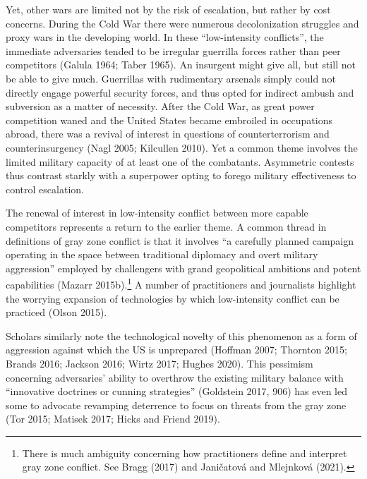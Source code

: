 \documentclass[
]{article}
\begin{document}
Yet, other wars are limited not by the risk of escalation, but rather by cost concerns. During the Cold War there were numerous decolonization struggles and proxy wars in the developing world. In these ``low-intensity conflicts'', the immediate adversaries tended to be irregular guerrilla forces rather than peer competitors (Galula 1964; Taber 1965). An insurgent might give all, but still not be able to give much. Guerrillas with rudimentary arsenals simply could not directly engage powerful security forces, and thus opted for indirect ambush and subversion as a matter of necessity. After the Cold War, as great power competition waned and the United States became embroiled in occupations abroad, there was a revival of interest in questions of counterterrorism and counterinsurgency (Nagl 2005; Kilcullen 2010). Yet a common theme involves the limited military capacity of at least one of the combatants. Asymmetric contests thus contrast starkly with a superpower opting to forego military effectiveness to control escalation.

The renewal of interest in low-intensity conflict between more capable competitors represents a return to the earlier theme. A common thread in definitions of gray zone conflict is that it involves ``a carefully planned campaign operating in the space between traditional diplomacy and overt military aggression'' employed by challengers with grand geopolitical ambitions and potent capabilities (Mazarr 2015b).\footnote{There is much ambiguity concerning how practitioners define and interpret gray zone conflict. See Bragg (2017) and Janičatová and Mlejnková (2021).} A number of practitioners and journalists highlight the worrying expansion of technologies by which low-intensity conflict can be practiced (Olson 2015).

Scholars similarly note the technological novelty of this phenomenon as a form of aggression against which the US is unprepared (Hoffman 2007; Thornton 2015; Brands 2016; Jackson 2016; Wirtz 2017; Hughes 2020). This pessimism concerning adversaries' ability to overthrow the existing military balance with ``innovative doctrines or cunning strategies'' (Goldstein 2017, 906) has even led some to advocate revamping deterrence to focus on threats from the gray zone (Tor 2015; Matisek 2017; Hicks and Friend 2019).
\end{document}
